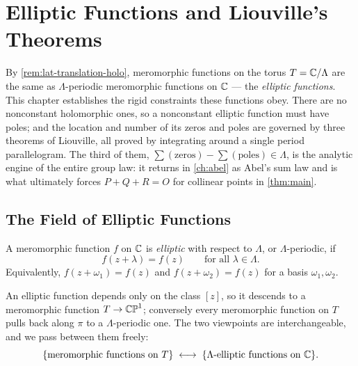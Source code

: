 \chapter{Elliptic Functions and Liouville's Theorems}
\label{ch:elliptic_liouville}

By \cref{rem:lat-translation-holo}, meromorphic functions on the torus
\(T = \mathbb{C}/\Lambda\) are the same as \(\Lambda\)-periodic meromorphic functions on
\(\mathbb{C}\) --- the \emph{elliptic functions}. This chapter establishes the rigid
constraints these functions obey. There are no nonconstant holomorphic ones, so
a nonconstant elliptic function must have poles; and the location and number of
its zeros and poles are governed by three theorems of Liouville, all proved by
integrating around a single period parallelogram. The third of them,
\(\sum(\text{zeros}) - \sum(\text{poles}) \in \Lambda\), is the analytic engine
of the entire group law: it returns in \cref{ch:abel} as Abel's sum law and is
what ultimately forces \(P + Q + R = O\) for collinear points in
\cref{thm:main}.

\section{The Field of Elliptic Functions}
\label{sec:ell-field}

\begin{definition}
\label{def:ell-elliptic}
A meromorphic function \(f\) on \(\mathbb{C}\) is \emph{elliptic} with respect to
\(\Lambda\), or \(\Lambda\)-periodic, if
\[
  f(z + \lambda) = f(z) \qquad \text{for all } \lambda \in \Lambda .
\]
Equivalently, \(f(z+\omega_1) = f(z)\) and \(f(z+\omega_2) = f(z)\) for a basis
\(\omega_1, \omega_2\).
\end{definition}

An elliptic function depends only on the class \([z]\), so it descends to a
meromorphic function \(T \to \mathbb{CP}^1\); conversely every meromorphic function on
\(T\) pulls back along \(\pi\) to a \(\Lambda\)-periodic one. The two viewpoints
are interchangeable, and we pass between them freely:
\[
  \{\text{meromorphic functions on } T\}
  \;\longleftrightarrow\;
  \{\Lambda\text{-elliptic functions on } \mathbb{C}\}.
\]

